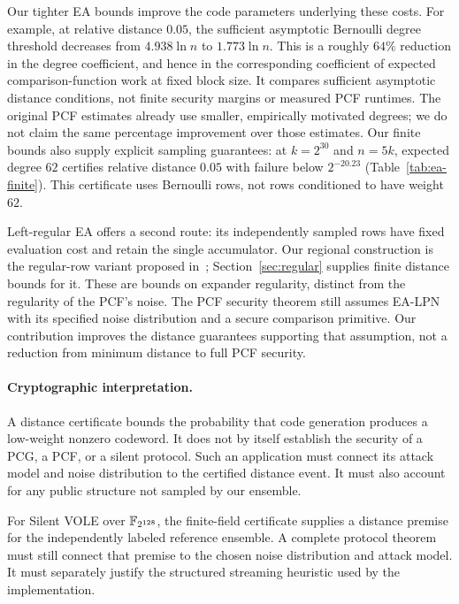 Our tighter EA bounds improve the code parameters underlying these costs.
For example, at relative distance $0.05$, the sufficient asymptotic
Bernoulli degree threshold decreases from $4.938\ln n$ to $1.773\ln n$.
This is a roughly $64\%$ reduction in the degree coefficient, and hence
in the corresponding coefficient of expected comparison-function work
at fixed block size.
It compares sufficient asymptotic distance conditions, not finite security
margins or measured PCF runtimes.  The original PCF estimates already use
smaller, empirically motivated degrees; we do not claim the same percentage
improvement over those estimates.
Our finite bounds also supply explicit sampling guarantees: at
$k=2^{30}$ and $n=5k$, expected degree $62$ certifies relative distance
$0.05$ with failure below $2^{-20.23}$
(Table~\ref{tab:ea-finite}).  This certificate uses Bernoulli rows, not
rows conditioned to have weight $62$.

Left-regular EA offers a second route: its independently sampled rows have
fixed evaluation cost and retain the single accumulator.
Our regional construction is the regular-row variant proposed
in~\cite[Section~3.4]{EA}; Section~\ref{sec:regular} supplies finite
distance bounds for it.  These are bounds on expander regularity, distinct
from the regularity of the PCF's noise.
The PCF security theorem still assumes EA-LPN with its specified noise
distribution and a secure comparison primitive.  Our contribution improves
the distance guarantees supporting that assumption, not a reduction from
minimum distance to full PCF security.

\paragraph{Cryptographic interpretation.}
A distance certificate bounds the probability that code generation produces
a low-weight nonzero codeword.  It does not by itself establish the security
of a PCG, a PCF, or a silent protocol.  Such an application must connect its attack
model and noise distribution to the certified distance event.  It must also
account for any public structure not sampled by our ensemble.

For Silent VOLE over $\mathbb F_{2^{128}}$, the finite-field certificate supplies a
distance premise for the independently labeled reference ensemble.  A
complete protocol theorem must still connect that premise to the chosen noise
distribution and attack model.  It must separately justify the structured
streaming heuristic used by the implementation.


